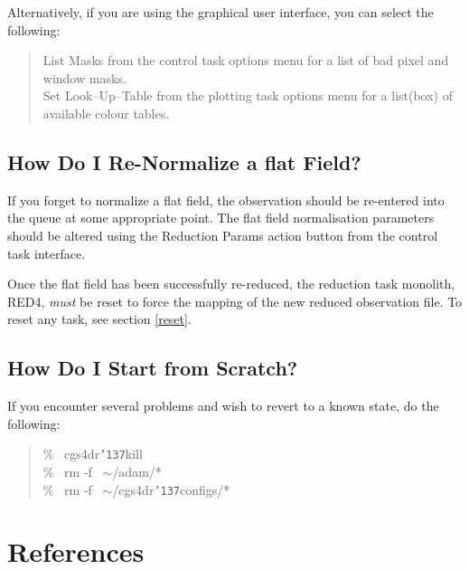 \documentclass[a4paper]{book}
\newcommand{\stardocinitials}  {SUN}
\newcommand{\stardocnumber}    {27.5}
\newcommand{\stardocname}{\stardocinitials /\stardocnumber}
\renewcommand{\_}{{\tt\char'137}}
\begin{document}
Alternatively, if you are using the graphical user interface, you can select the following:

\begin{quote}
 {\sf List Masks} from the control task options menu for a list of bad pixel and window masks.\\
 {\sf Set Look--Up--Table} from the plotting task options menu for a list(box) of available colour tables.
\end{quote}

\section{How Do I Re-Normalize a {\sc flat} Field?}
If you forget to normalize a {\sc flat} field, the observation should be re-entered into the
queue at some appropriate point. The {\sc flat} field normalisation parameters should be
altered using the {\sf Reduction Params} action button from the control task interface.

Once the {\sc flat} field has been successfully re-reduced, the reduction task monolith,
RED4, {\em must} be reset to force the mapping of the new reduced observation file. To reset
any task, see section \ref{reset}.

\section{How Do I Start from Scratch?}
\label{restart}
If you encounter several problems and wish to revert to a known state, do the following:

\begin{quote}
  \% \ cgs4dr\_kill \\
  \% \ rm -f \ $\sim$/adam/* \\
  \% \ rm -f \ $\sim$/cgs4dr\_configs/*
\end{quote}

\chapter*{References}
\markboth{References}{\stardocname}
\end{document}

